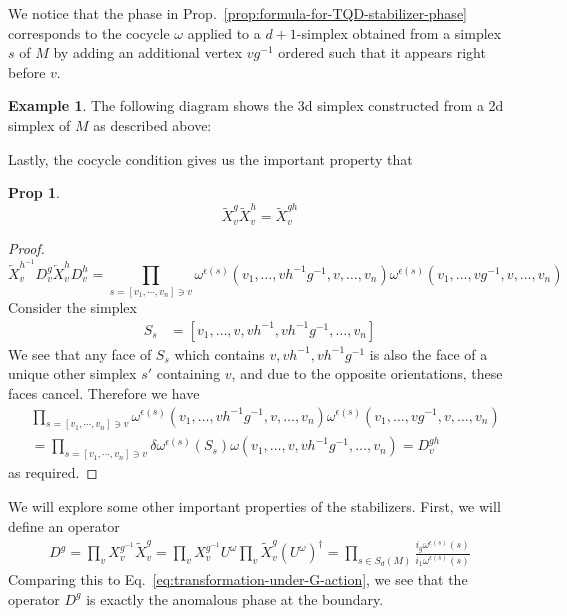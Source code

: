 \documentclass{article}
\theoremstyle{definition}
\theoremstyle{definition}
\newtheorem{prop}{Prop}
\newtheorem{ex}{Example}
\begin{document}
We notice that the phase in Prop.~\ref{prop:formula-for-TQD-stabilizer-phase}
corresponds to the cocycle $\omega$ applied to a $d+1$-simplex obtained from a
simplex $s$ of $M$ by adding an additional vertex $vg^{-1}$ ordered such that it
appears right before $v$.

\begin{ex}\label{ex:geometric-interpretation-of-TQD-phase}
The following diagram shows the 3d simplex constructed from a 2d simplex of $M$
as described above:
\begin{equation}

\end{equation}
\end{ex}

Lastly, the cocycle condition gives us the important property that
\begin{prop}\label{prop:TQD-stabilizers-are-group-representation}
  \begin{equation}
\widetilde X_v^g \widetilde X_v^h = \widetilde X_v^{gh}
\end{equation}
\end{prop}

\begin{proof}
\begin{equation}
\overleftarrow X_v^{h^{-1}}D_v^g \overleftarrow X_v^hD_v^h = \prod_{s = [v_1, \cdots, v_n] \ni v}\omega^{\epsilon(s)}(v_1, \ldots, vh^{-1}g^{-1}, v, \ldots, v_n)\omega^{\epsilon(s)}(v_1, \ldots, vg^{-1}, v, \ldots, v_n)
\end{equation}
Consider the simplex
\begin{align}
  S_s &= [v_1, \ldots, v, vh^{-1}, vh^{-1}g^{-1}, \ldots, v_n]
\end{align}
We see that any face of $S_s$ which contains $v, vh^{-1}, vh^{-1}g^{-1}$ is also
the face of a unique other simplex $s'$ containing $v$, and due to the opposite
orientations, these faces cancel. Therefore we have
\begin{align}
  &\prod_{s = [v_1, \cdots, v_n] \ni v}\omega^{\epsilon(s)}(v_1, \ldots, vh^{-1}g^{-1}, v, \ldots, v_n)\omega^{\epsilon(s)}(v_1, \ldots, vg^{-1}, v, \ldots, v_n) \\
  &= 
\prod_{s = [v_1, \cdots, v_n] \ni v}\delta \omega^{\epsilon(s)}(S_s)\omega(v_1, \ldots, v, vh^{-1}g^{-1}, \ldots, v_n) = D_v^{gh}
\end{align}
as required.
\end{proof}

We will explore some other important properties of the stabilizers. First, we
will define an operator
\begin{align}\label{eq:stabilizer-product-phase-definition}
  D^g = \prod_{v}X_v^{g^{-1}}\widetilde X_v^g = 
  \prod_{v}X_v^{g^{-1}}U^\omega\prod_{v}\widetilde X_v^g(U^\omega)^\dagger = \prod_{s \in S_d(M)}\frac{i_g\omega^{\epsilon(s)}(s)}{i_1\omega^{\epsilon(s)}(s)}
\end{align}
Comparing this to Eq.~\eqref{eq:transformation-under-G-action}, we see that the
operator $D^g$ is exactly the anomalous phase at the boundary.
\end{document}
